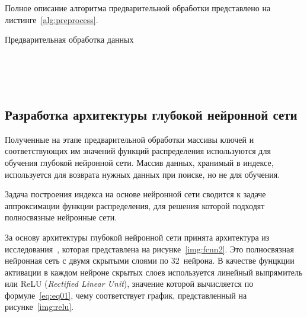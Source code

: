 Полное описание алгоритма предварительной обработки представлено на
листинге~\ref{alg:preprocess}.

\begin{algorithm}
    \caption{Предварительная обработка данных ~~~~~~~~~~~~~~~~~~~~}
    \label{alg:preprocess}
    \small


\end{algorithm}

~\\
~\\
~\\
\subsection{Разработка архитектуры глубокой нейронной сети}

Полученные на этапе предварительной обработки массивы ключей и соответствующих
им значений функций распределения используются для обучения глубокой нейронной
сети. Массив данных, хранимый в индексе, используется для возврата нужных
данных при поиске, но не для обучения.

Задача построения индекса на основе нейронной сети сводится к задаче
аппроксимации функции распределения, для решения которой подходят полносвязные
нейронные сети.

За основу архитектуры глубокой нейронной сети принята архитектура из
исследования~\cite{1D2D}, которая представлена на рисунке~\ref{img:fcnn2}.  Это
полносвязная нейронная сеть с двумя скрытыми слоями по 32~нейрона.  В качестве
фунцкции активации в каждом нейроне скрытых слоев используется линейный
выпрямитель или ReLU (\textit{Rectified Linear Unit}), значение которой
вычисляется по формуле~\ref{eq:eq01}, чему соответствует график, представленный
на рисунке~\ref{img:relu}.

